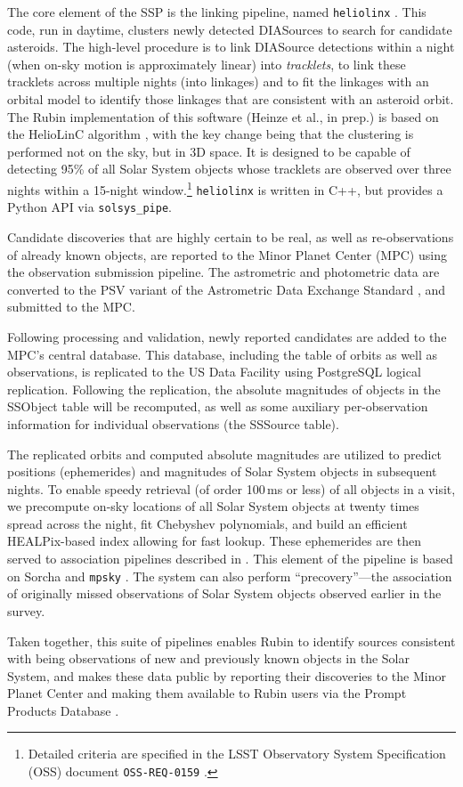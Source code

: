 The core element of the SSP is the linking pipeline, named \texttt{heliolinx} \citep{heliolinx}.
This code, run in daytime, clusters newly detected DIASources to search for candidate asteroids.
The high-level procedure is to link DIASource detections within a night (when on-sky motion is approximately linear) into \emph{tracklets}, to link these tracklets across multiple nights (into linkages) and to fit the linkages with an orbital model to identify those linkages that are consistent with an asteroid orbit.
The Rubin implementation of this software (Heinze et al., in prep.) is based on the HelioLinC algorithm \citep{2018AJ....156..135H}, with the key change being that the clustering is performed not on the sky, but in 3D space.
It is designed to be capable of detecting 95\% of all Solar System objects whose tracklets are observed over three nights within a 15-night window.\footnote{Detailed criteria are specified in the LSST Observatory System Specification (OSS) document \texttt{OSS-REQ-0159} \citep{LSE-30}.}
\texttt{heliolinx} is written in C++, but provides a Python API via \texttt{solsys\_pipe}.

Candidate discoveries that are highly certain to be real, as well as re-observations of already known objects, are reported to the Minor Planet Center (MPC) using the observation submission pipeline.
The astrometric and photometric data are converted to the PSV variant of the Astrometric Data Exchange Standard \citep[ADES;][]{2017DPS....4911214C}, and submitted to the MPC.

Following processing and validation, newly reported candidates are added to the MPC's central database.
This database, including the table of orbits as well as observations, is replicated to the US Data Facility using PostgreSQL logical replication.
Following the replication, the absolute magnitudes of objects in the SSObject table will be recomputed, as well as some auxiliary per-observation information for individual observations (the SSSource table).

The replicated orbits and computed absolute magnitudes are utilized to predict positions (ephemerides) and magnitudes of Solar System objects in subsequent nights.
To enable speedy retrieval (of order 100\,ms or less) of all objects in a visit, we precompute on-sky locations of all Solar System objects at twenty times spread across the night, fit Chebyshev polynomials, and build an efficient HEALPix-based index allowing for fast lookup.
These ephemerides are then served to association pipelines described in .
This element of the pipeline is based on Sorcha \citep[computation;][]{2025AJ....170..100M} and \texttt{mpsky} \citep[fast lookup and serving;][]{mpsky}.
The system can also perform ``precovery''---the association of originally missed observations of Solar System objects observed earlier in the survey.

Taken together, this suite of pipelines enables Rubin to identify sources consistent with being observations of new and previously known objects in the Solar System, and makes these data public by reporting their discoveries to the Minor Planet Center and making them available to Rubin users via the Prompt Products Database \citep[PPDB;][]{DMTN-293}.
